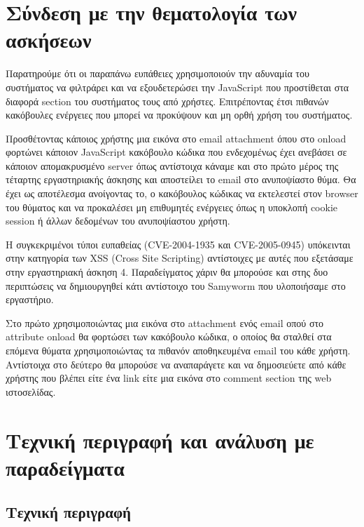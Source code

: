 %
%

\setcounter{section}{1}
\section{Σύνδεση με την θεματολογία των ασκήσεων}

\noindent
Παρατηρούμε ότι οι παραπάνω ευπάθειες χρησιμοποιούν την αδυναμία του συστήματος να φιλτράρει και να εξουδετερώσει την JavaScript που προστίθεται στα διαφορά section του συστήματος τους από χρήστες. Επιτρέποντας έτσι πιθανών κακόβουλες ενέργειες που μπορεί να προκύψουν και μη ορθή χρήση του συστήματος. 

\noindent
Προσθέτοντας κάποιος χρήστης μια εικόνα στο email attachment όπου στο onload φορτώνει κάποιον JavaScript κακόβουλο κώδικα που ενδεχομένως έχει ανεβάσει σε κάποιον απομακρυσμένο server όπως αντίστοιχα κάναμε και στο πρώτο μέρος της τέταρτης εργαστηριακής άσκησης και αποστείλει το email στο ανυποψίαστο θύμα. Θα έχει ως αποτέλεσμα ανοίγοντας το, ο κακόβουλος κώδικας να εκτελεστεί στον browser του θύματος και να προκαλέσει μη επιθυμητές ενέργειες όπως η υποκλοπή cookie session ή άλλων δεδομένων του ανυποψίαστου χρήστη. 

\noindent
Η συγκεκριμένοι τύποι ευπαθείας (CVE-2004-1935 και CVE-2005-0945) υπόκεινται στην κατηγορία των XSS (Cross Site Scripting) αντίστοιχες με αυτές που εξετάσαμε στην εργαστηριακή άσκηση 4. Παραδείγματος χάριν θα μπορούσε και στης δυο περιπτώσεις να δημιουργηθεί κάτι αντίστοιχο του Samyworm που υλοποιήσαμε στο εργαστήριο. 

\noindent
Στο πρώτο χρησιμοποιώντας μια εικόνα στο attachment ενός email οπού στο attribute onload θα φορτώσει των κακόβουλο κώδικα, ο οποίος θα σταλθεί στα επόμενα θύματα χρησιμοποιώντας τα πιθανόν αποθηκευμένα email του κάθε χρήστη. Αντίστοιχα στο δεύτερο θα μπορούσε να αναπαράγετε και να δημοσιεύετε από κάθε χρήστης που βλέπει είτε ένα link είτε μια εικόνα στο comment section της web ιστοσελίδας. 




\section{Τεχνική περιγραφή και ανάλυση με παραδείγματα}

\subsection{Τεχνική περιγραφή}

